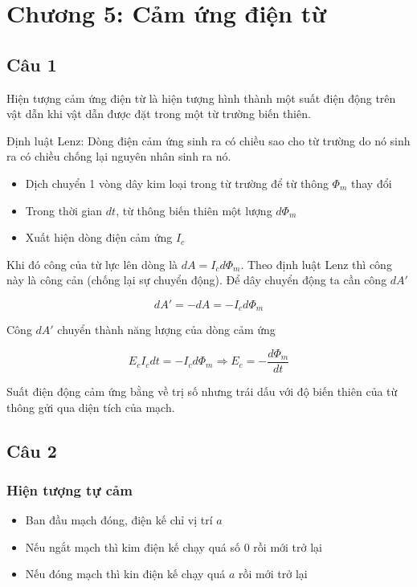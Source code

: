 \section[Chương 5]{Chương 5: Cảm ứng điện từ}

\subsection{Câu 1}

Hiện tượng cảm ứng điện từ là hiện tượng hình thành một suất điện động trên vật dẫn khi vật dẫn được đặt trong một từ trường biến thiên.

Định luật Lenz: Dòng điện cảm ứng sinh ra có chiều sao cho từ trường do nó sinh ra có chiều chống lại nguyên nhân sinh ra nó.

\begin{itemize}
  \item Dịch chuyển 1 vòng dây kim loại trong từ trường để từ thông $\Phi_m$ thay đổi
  \item Trong thời gian $dt$, từ thông biến thiên một lượng $d\Phi_m$
  \item Xuất hiện dòng điện cảm ứng $I_c$
\end{itemize}

Khi đó công của từ lực lên dòng là $dA = I_cd\Phi_m$. Theo định luật Lenz thì công này là công cản (chống lại sự chuyển động). Để dây chuyển động ta cần công $dA'$

\begin{equation*}
  dA' = -dA = -I_cd\Phi_m
\end{equation*}

Công $dA'$ chuyển thành năng lượng của dòng cảm ứng

\begin{equation*}
  E_cI_cdt = -I_cd\Phi_m \Rightarrow E_c = -\frac{d\Phi_m}{dt}
\end{equation*}

Suất điện động cảm ứng bằng về trị số nhưng trái dấu với độ biến thiên của từ thông gửi qua diện tích của mạch.

\subsection{Câu 2}

\subsubsection{Hiện tượng tự cảm}

\begin{itemize}
  \item Ban đầu mạch đóng, điện kế chỉ vị trí $a$
  \item Nếu ngắt mạch thì kim điện kế chạy quá số $0$ rồi mới trở lại
  \item Nếu đóng mạch thì kin điện kế chạy quá $a$ rồi mới trở lại
\end{itemize}

